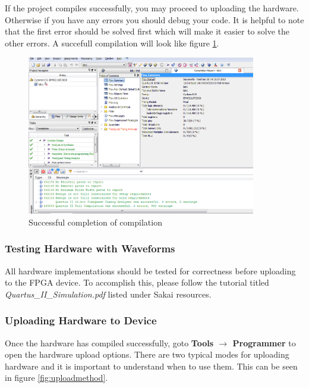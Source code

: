 If the project compiles successfully, you may proceed to uploading the hardware. Otherwise if you have any errors you should debug your code. It is helpful to note that the first error should be solved first which will make it easier to solve the other errors. A succefull compilation will look like figure \ref{fig:compileresuts}.

\begin{figure}[H]
	\centering
	\includegraphics[width=100mm]{Lab1/figures/compileresults.png}
	\caption{Successful completion of compilation}
	\label{fig:compileresuts}
\end{figure}

\subsubsection{Testing Hardware with Waveforms}

All hardware implementations should be tested for correctness before uploading to the FPGA device. To accomplish this, please follow the tutorial titled \emph{Quartus\_II\_Simulation.pdf} listed under Sakai resources.

\subsubsection{Uploading Hardware to Device}

Once the hardware has compiled successfully, goto {\bf Tools $\rightarrow$ Programmer} to open the hardware upload options. There are two typical modes for uploading hardware and it is important to understand when to use them. This can be seen in figure \ref{fig:uploadmethod}.


